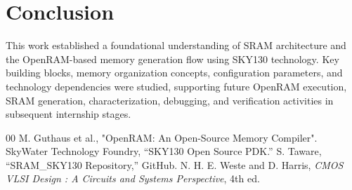 \documentclass[conference]{IEEEtran}
\begin{document}
\section{Conclusion}
This work established a foundational understanding of SRAM architecture and the OpenRAM-based memory generation flow using SKY130 technology. Key building blocks, memory organization concepts, configuration parameters, and technology dependencies were studied, supporting future OpenRAM execution, SRAM generation, characterization, debugging, and verification activities in subsequent internship stages.

\balance
\begin{thebibliography}{00}
 M. Guthaus et al., "OpenRAM: An Open-Source Memory Compiler".
 SkyWater Technology Foundry, ``SKY130 Open Source PDK.''
 S. Taware, ``SRAM\_SKY130 Repository,'' GitHub.
 N. H. E. Weste and D. Harris, \textit{CMOS VLSI Design : A Circuits and Systems Perspective}, 4th ed.
\end{thebibliography}
\end{document}
